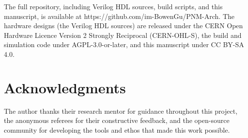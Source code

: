 \documentclass[12pt,onecolumn]{article}
\begin{document}
The full repository, including Verilog HDL sources, build scripts, and this manuscript, is available at https://github.com/im-BowenGu/PNM-Arch. The hardware designs (the Verilog HDL sources) are released under the CERN Open Hardware Licence Version 2 Strongly Reciprocal (CERN-OHL-S)\cite{20}, the build and simulation code under AGPL-3.0-or-later, and this manuscript under CC BY-SA 4.0.

\section*{Acknowledgments}\label{sec:acknowledgments}

The author thanks their research mentor for guidance throughout this project, the anonymous referees for their constructive feedback, and the open-source community for developing the tools and ethos that made this work possible.
\end{document}
